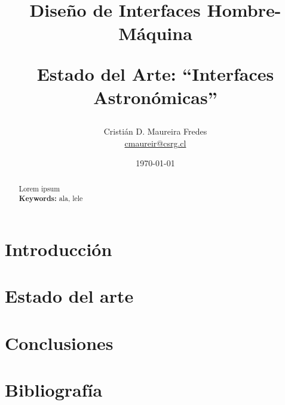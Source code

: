 \documentclass[letter, 10pt]{IEEEtran}
\begin{document}
%
\pagestyle{empty}

\title{Diseño de Interfaces Hombre-Máquina \\ \begin{Large}Estado del Arte: ``Interfaces Astronómicas''\end{Large}}
\author{Cristián D. Maureira Fredes\\\url{cmaureir@csrg.cl}}
\date{\today}

\maketitle
\begin{abstract}
Lorem ipsum\\
{\bf Keywords: } ala, lele
\end{abstract}



\section{Introducción}
\label{sec:introduccion}


\section{Estado del arte}
\label{sec:estado_arte}


\section{Conclusiones}
\label{sec:conclusiones}


\section{Bibliografía}
%
\end{document}
